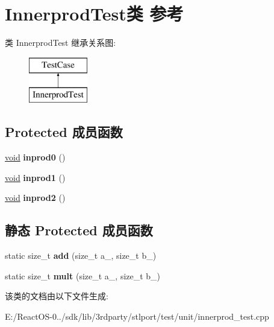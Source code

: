 \hypertarget{class_innerprod_test}{}\section{Innerprod\+Test类 参考}
\label{class_innerprod_test}
类 Innerprod\+Test 继承关系图\+:\begin{figure}[H]
\begin{center}
\leavevmode
\includegraphics[height=2.000000cm]{class_innerprod_test}
\end{center}
\end{figure}
\subsection*{Protected 成员函数}
\begin{DoxyCompactItemize}
\item 
\mbox{\label{class_innerprod_test_aede826fdc92350064f6b958c177161b6}} 
\hyperlink{interfacevoid}{void} {\bfseries inprod0} ()
\item 
\mbox{\label{class_innerprod_test_a32daee2edea89149674ba792b073fabe}} 
\hyperlink{interfacevoid}{void} {\bfseries inprod1} ()
\item 
\mbox{\label{class_innerprod_test_a505c2903e4bf0ad8d79754cae4755b59}} 
\hyperlink{interfacevoid}{void} {\bfseries inprod2} ()
\end{DoxyCompactItemize}
\subsection*{静态 Protected 成员函数}
\begin{DoxyCompactItemize}
\item 
\mbox{\label{class_innerprod_test_ac7d95c5db1aad436ce38d597dffe6faf}} 
static size\+\_\+t {\bfseries add} (size\+\_\+t a\+\_\+, size\+\_\+t b\+\_\+)
\item 
\mbox{\label{class_innerprod_test_aa5dede926b1a3aa88d76b79bb55b596c}} 
static size\+\_\+t {\bfseries mult} (size\+\_\+t a\+\_\+, size\+\_\+t b\+\_\+)
\end{DoxyCompactItemize}


该类的文档由以下文件生成\+:\begin{DoxyCompactItemize}
\item 
E\+:/\+React\+O\+S-\/0../sdk/lib/3rdparty/stlport/test/unit/innerprod\+\_\+test.\+cpp\end{DoxyCompactItemize}
